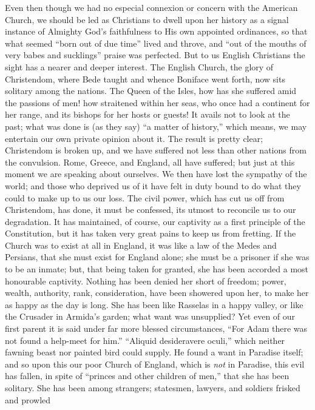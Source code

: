 Even then though we had no especial connexion or
concern with the American Church, we should be led as Christians to
dwell upon her history as a signal instance of Almighty God's
faithfulness to His own appointed ordinances, so that what seemed ``born
out of due time'' lived and throve, and ``out of the mouths of very
babes and sucklings'' praise was perfected. But to us English
Christians the sight has a nearer and deeper interest. The English
Church, the glory of Christendom, where Bede taught and whence
Boniface went forth, now sits solitary among the nations. The Queen of
the Isles, how has she suffered amid the passions of men! how
straitened within her seas, who once had a continent for her range,
and its bishops for her hosts or guests! It avails not to look at the
past; what was done is (as they say) ``a matter of history,''
which means, we may entertain our own private opinion about it. The
result is pretty clear; Christendom is broken up, and we have suffered
not less than other nations from the convulsion. Rome, Greece, and
England, all have suffered; but just at this moment we are speaking
about ourselves. We then have lost the sympathy of the world; and
those who deprived us of it have felt in duty bound to do what they
could to make up to us our loss. The civil power, which has cut us off
from Christendom, has done, it must be confessed, its utmost to
reconcile us to our degradation. It has maintained, of course, our
captivity as a first principle of the Constitution, but it has taken
very great pains to keep us from fretting. If the Church was to exist
at all in England, it was like a law of the Medes and Persians, that
she must exist for England alone; she must be a prisoner if she was to
be an inmate; but, that being taken for granted, she has been accorded
a most honourable captivity. Nothing has been denied her short of
freedom; power, wealth, authority, rank, consideration, have been
showered upon her, to make her as happy as the day is long. She has
been like Rasselas in a happy valley, or like the Crusader in Armida's
garden; what want was unsupplied? Yet even of our first parent it is
said under far more blessed circumstances, ``For Adam there was not
found a help-meet for him.'' ``Aliquid desideravere oculi,'' which
neither fawning beast nor painted bird could supply. He found a want
in Paradise itself; and so upon this our poor Church of England, which
is \emph{not} in Paradise, this evil has fallen, in spite of ``princes
and other children of men,'' that she has been solitary. She has been
among strangers; statesmen, lawyers, and soldiers frisked and prowled
